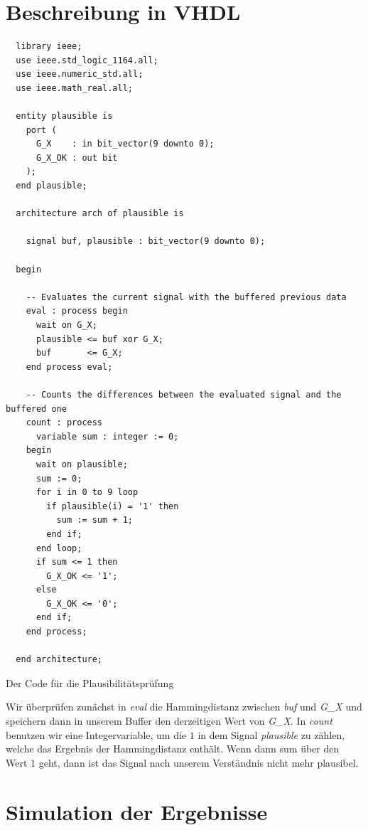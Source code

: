 \documentclass{report}
\newenvironment{longlisting}{\captionsetup{type=listing}}{}
\begin{document}
\section{Beschreibung in VHDL}
\label{sec:beschreibung-vhdl}
\begin{longlisting}
  \centering
  
  \begin{verbatim}
  library ieee;
  use ieee.std_logic_1164.all;
  use ieee.numeric_std.all;
  use ieee.math_real.all;

  entity plausible is
    port (
      G_X    : in bit_vector(9 downto 0);
      G_X_OK : out bit
    );
  end plausible;

  architecture arch of plausible is

    signal buf, plausible : bit_vector(9 downto 0);

  begin

    -- Evaluates the current signal with the buffered previous data
    eval : process begin
      wait on G_X;
      plausible <= buf xor G_X;
      buf       <= G_X;
    end process eval;

    -- Counts the differences between the evaluated signal and the buffered one
    count : process
      variable sum : integer := 0;
    begin
      wait on plausible;
      sum := 0;
      for i in 0 to 9 loop
        if plausible(i) = '1' then
          sum := sum + 1;
        end if;
      end loop;
      if sum <= 1 then
        G_X_OK <= '1';
      else
        G_X_OK <= '0';
      end if;
    end process;

  end architecture;
  \end{verbatim}
  \caption{Der Code für die Plausibilitätsprüfung}
  \label{fig:codeA}
\end{longlisting}
\noindent
Wir überprüfen zunächst in \textit{eval} die Hammingdistanz zwischen \textit{buf} und \textit{G\_X} und speichern dann in unserem Buffer den derzeitigen Wert von \textit{G\_X}. In \textit{count} benutzen wir eine Integervariable, um die $1$ in dem Signal \textit{plausible} zu zählen, welche das Ergebnis der Hammingdistanz enthält. Wenn dann sum über den Wert $1$ geht, dann ist das Signal nach unserem Verständnis nicht mehr plausibel. 

\newpage

\section{Simulation der Ergebnisse}
\label{sec:simul-der-ergebn}
\end{document}
